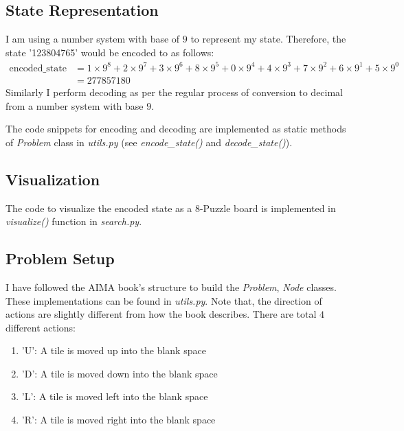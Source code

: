 \subsection*{State Representation}
I am using a number system with base of $9$ to represent my state. Therefore, the state '123804765' would be encoded to as follows:
\begin{align*}
	\text{encoded\_state} &= 1\times 9^8 + 2 \times 9^7 + 3 \times 9^6 + 8 \times 9^5 + 0 \times 9^4 + 4 \times 9^3 + 7 \times 9^2 + 6 \times 9^1 + 5 \times 9^0\\
	&= 277857180
\end{align*}
Similarly I perform decoding as per the regular process of conversion to decimal from a number system with base $9$.

The code snippets for encoding and decoding are implemented as static methods of \textit{Problem} class in \textit{utils.py} (see \textit{encode\_state()} and \textit{decode\_state()}). 
\subsection*{Visualization}
The code to visualize the encoded state as a 8-Puzzle board is implemented in \textit{visualize()} function in \textit{search.py}.
\subsection*{Problem Setup}
I have followed the AIMA book's structure to build the \textit{Problem}, \textit{Node} classes. These implementations can be found in \textit{utils.py}.
Note that, the direction of actions are slightly different from how the book describes. There are total $4$ different actions:
\begin{enumerate}
	\item 'U': A tile is moved up into the blank space
	\item 'D': A tile is moved down into the blank space
	\item 'L': A tile is moved left into the blank space
	\item 'R': A tile is moved right into the blank space
\end{enumerate} 
